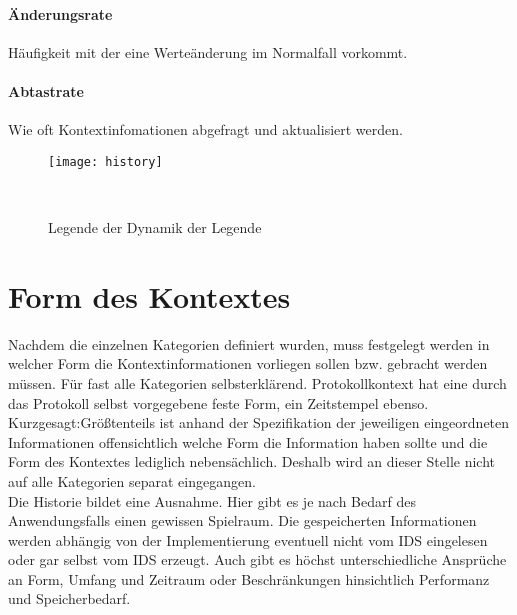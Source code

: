 \paragraph{Änderungsrate} 
Häufigkeit mit der eine Werteänderung im Normalfall vorkommt.
\paragraph{Abtastrate}
Wie oft Kontextinfomationen abgefragt und aktualisiert werden.
\begin{figure}[H]
\centering
\texttt{[image: history]}
\caption{Legende der Dynamik der Legende}
\
\end{figure}


\section{Form des Kontextes}
Nachdem die einzelnen Kategorien definiert wurden, muss festgelegt werden in welcher Form die Kontextinformationen vorliegen sollen bzw. gebracht werden müssen. Für fast alle Kategorien selbsterklärend. Protokollkontext hat eine durch das Protokoll selbst vorgegebene feste Form, ein Zeitstempel ebenso. Kurzgesagt:Größtenteils ist anhand der Spezifikation der jeweiligen eingeordneten Informationen offensichtlich welche Form die Information haben sollte und die Form des Kontextes lediglich nebensächlich. Deshalb wird an dieser Stelle nicht auf alle Kategorien separat eingegangen.\\
Die Historie bildet eine Ausnahme. Hier gibt es je nach Bedarf des Anwendungsfalls einen gewissen Spielraum. Die gespeicherten Informationen werden abhängig von der Implementierung eventuell nicht vom IDS eingelesen oder gar selbst vom IDS erzeugt. Auch gibt es höchst unterschiedliche Ansprüche an Form, Umfang und Zeitraum oder Beschränkungen hinsichtlich Performanz und Speicherbedarf.
